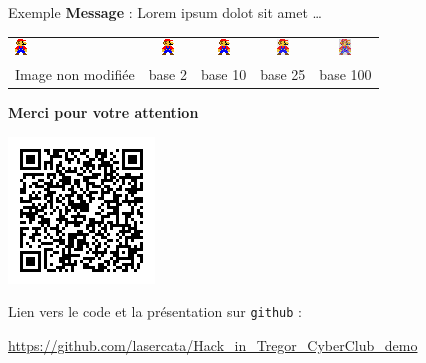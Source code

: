 \documentclass{beamer}
\begin{document}
    \begin{frame}{Exemple}%
        \textbf{Message} : Lorem ipsum dolot sit amet \ldots

        \begin{center}
            \begin{tabular}{p{53pt}cccc}
                \includegraphics[scale=4.5]{pics/mario_0.png}
                &
                \includegraphics[scale=4.5]{pics/mario_lorem_2.png}
                &
                \includegraphics[scale=4.5]{pics/mario_lorem_10.png}
                &
                \includegraphics[scale=4.5]{pics/mario_lorem_25.png}
                &
                \includegraphics[scale=4.5]{pics/mario_lorem_100.png}
                \\
                Image non modifiée
                & base 2
                & base 10
                & base 25
                & base 100
            \end{tabular}
        \end{center}
    \end{frame}%

    \begin{frame}%
        \begin{center}
            \large{\bf Merci pour votre attention}
        \end{center}

        \vspace{12pt}
        
        \begin{center}
            \includegraphics[scale=1]{pics/github_qrcode.png}

            Lien vers le code et la présentation sur \texttt{github} :

            \url{https://github.com/lasercata/Hack_in_Tregor_CyberClub_demo}
        \end{center}
    \end{frame}%
    
\end{document}
